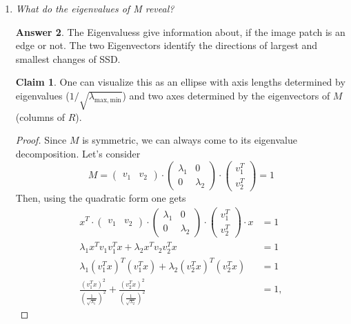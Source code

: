 \documentclass[a4paper,12 pt]{article}
\theoremstyle{definition}
\theoremstyle{remark}
\theoremstyle{definition}
\theoremstyle{definition}
\theoremstyle{definition}
\theoremstyle{definition}
\newtheorem{claim}{Claim}
\theoremstyle{remark}
\theoremstyle{remark}
\theoremstyle{definition}
\theoremstyle{definition}
\newtheorem*{answer}{Answer}
\begin{document}
\begin{enumerate}
\begin{enumerate}
\begin{answer}
\begin{itemize}
\end{itemize}
\end{answer}
\item \textit{What do the eigenvalues of M reveal? }
\begin{answer}
The Eigenvaluess give information about, if the image patch is an edge or not. The two Eigenvectors identify the directions of largest and smallest changes of SSD. \\
\begin{claim}
One can visualize this as an ellipse with axis lengths determined by eigenvalues ($1/\sqrt{\lambda_\mathrm{max,min}}$) and two axes determined by the eigenvectors of $M$ (columns of $R$). 
\end{claim}
\begin{proof} Since $M$ is symmetric, we can always come to its eigenvalue decomposition. Let's consider \begin{equation}
M=\begin{pmatrix} v_1 &v_2 \end{pmatrix}\cdot \begin{pmatrix}
\lambda_1 &0\\
0&\lambda_2
\end{pmatrix}\cdot \begin{pmatrix}
 v_1^T\\
 v_2^T
 \end{pmatrix}=1
\end{equation}
Then, using the quadratic form one gets 
\begin{equation}
\begin{split}x^T\cdot \begin{pmatrix} v_1 &v_2 \end{pmatrix}\cdot \begin{pmatrix}
\lambda_1 &0\\
0&\lambda_2
\end{pmatrix}\cdot \begin{pmatrix}
 v_1^T\\
 v_2^T
 \end{pmatrix}\cdot x&=1\\
 \lambda_1 x^T v_1  v_1^T  x + \lambda_2 x^T v_2  v_2^Tx&=1\\
 \lambda_1  (v_1^Tx)^T (v_1^Tx)+ \lambda_2 (v_2^Tx)^T (v_2^Tx)&=1\\
 \frac{(v_1^Tx)^2}{\left( \frac{1}{\sqrt{\lambda_1}}\right)^2}+ \frac{(v_2^Tx)^2}{\left (\frac{1}{\sqrt{\lambda_2}}\right)^2}&=1,
\end{split}
\end{equation}

\end{proof}
\end{answer}
\end{enumerate}
\end{enumerate}
\end{document}
